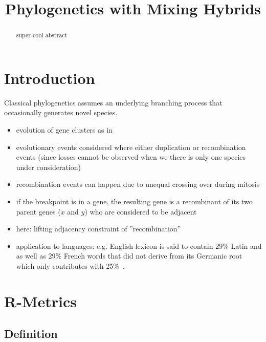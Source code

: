 \documentclass{article}
\begin{document}
\title{Phylogenetics with Mixing Hybrids}

\maketitle


\begin{abstract}
  super-cool abstract
\end{abstract}

\section{Introduction}

Classical phylogenetics assumes an underlying branching process that
occasionally generates novel species. 



\begin{itemize}
\item evolution of gene clusters as in~\cite{Prohaska:17a}
 \item evolutionary events considered where either duplication 
 or recombination events (since losses cannot be observed when 
 we there is only one species under consideration)
 \item recombination events can happen due to unequal crossing
 over during mitosis
 \item if the breakpoint is in a gene, the resulting gene is
 a recombinant of its two parent genes ($x$ and $y$) who are
 considered to be adjacent
 \item here: lifting adjacency constraint of ''recombination''
 \item application to languages: e.g. English lexicon is said
 to contain 29\% Latin and as well as 29\% French words that 
 did not derive from its Germanic root which only contributes 
 with 25\%~\cite{Finkenstaedt:73}.
\end{itemize}


\section{R-Metrics} 

\subsection{Definition} 
\end{document}
